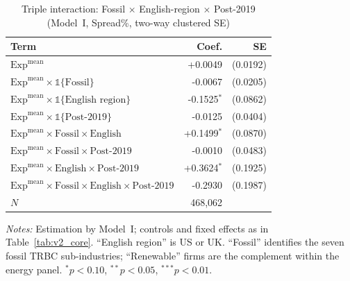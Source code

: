 \begin{table}[htbp]
\centering
\caption{Triple interaction: Fossil $\times$ English-region $\times$ Post-2019 (Model~I, Spread\%, two-way clustered SE)}
\label{tab:v2_triple}
\begin{threeparttable}
\begin{tabular}{l r r}
\toprule
Term & Coef. & SE \\
\midrule
$\mathrm{Exp}^{\text{mean}}$ & +0.0049 & (0.0192) \\
$\mathrm{Exp}^{\text{mean}}\!\times\!\mathbb{1}\{\text{Fossil}\}$ & -0.0067 & (0.0205) \\
$\mathrm{Exp}^{\text{mean}}\!\times\!\mathbb{1}\{\text{English region}\}$ & -0.1525$^{*}$ & (0.0862) \\
$\mathrm{Exp}^{\text{mean}}\!\times\!\mathbb{1}\{\text{Post-2019}\}$ & -0.0125 & (0.0404) \\
$\mathrm{Exp}^{\text{mean}}\!\times\!\text{Fossil}\!\times\!\text{English}$ & +0.1499$^{*}$ & (0.0870) \\
$\mathrm{Exp}^{\text{mean}}\!\times\!\text{Fossil}\!\times\!\text{Post-2019}$ & -0.0010 & (0.0483) \\
$\mathrm{Exp}^{\text{mean}}\!\times\!\text{English}\!\times\!\text{Post-2019}$ & +0.3624$^{*}$ & (0.1925) \\
$\mathrm{Exp}^{\text{mean}}\!\times\!\text{Fossil}\!\times\!\text{English}\!\times\!\text{Post-2019}$ & -0.2930 & (0.1987) \\
\midrule
$N$ & 468,062 & \\
\bottomrule
\end{tabular}
\begin{tablenotes}\small
\item \textit{Notes:} Estimation by Model~I; controls and fixed effects as in
Table~\ref{tab:v2_core}. ``English region'' is US or UK. ``Fossil'' identifies the seven fossil
TRBC sub-industries; ``Renewable'' firms are the complement within the energy panel.
$^{*}p<0.10$, $^{**}p<0.05$, $^{***}p<0.01$.
\end{tablenotes}
\end{threeparttable}
\end{table}